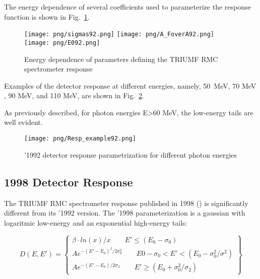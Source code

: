 The energy dependence of several coefficients used to parameterize the response
function is shown in Fig.~\ref{fig:parameterDependence}.

\begin{figure}[!h]
  \begin{center}
    \texttt{[image: png/sigmas92.png]} 
    \texttt{[image: png/A\_FoverA92.png]} 
    \texttt{[image: png/E092.png]} 
  \end{center}
  \caption{
    Energy dependence of parameters defining the TRIUMF RMC spectrometer response
    \cite{RMC_1992_PhysRevC.46.1094}
  }
  \label{fig:parameterDependence}
\end{figure}

Examples of the detector response at different energies, namely, \mbox{50 MeV},
70 MeV , 90 MeV, and 110 MeV, are shown in Fig.~\ref{fig:92ResponseExample}.

As previously described, for photon energies E>60 MeV, the low-energy tails are well evident.

\begin{figure}[!h]
\centering
\texttt{[image: png/Resp\_example92.png]}
\caption{'1992 detector response parametrization for different photon energies}
\label{fig:92ResponseExample}
\end{figure}


\subsection { 1998 Detector Response }

The TRIUMF RMC spectrometer response published in 1998 (\cite{RMC_1998_PhysRevC.58.1767})
is significantly different from its '1992 version.
The '1998 parameterization is a gaussian with logaritmic low-energy and an exponential
high-energy tails:

\begin{equation}
  D(E,E')= \left\{
    \begin{array}{ll}
      \beta \cdot ln(x)/x    \qquad E' \leq (E_0-\sigma_0) \\
      Ae^{-(E'-E_0)^2/2\sigma_0^2} \qquad E0-\sigma_0<E'<(E_0-\sigma_0^2/\sigma^2) \\
      Ae^{-(E'-E_0)/2\sigma_2}    \qquad E' \geq (E_0+\sigma_0^2/\sigma_2)
    \end{array}
  \right\}
\end{equation}


